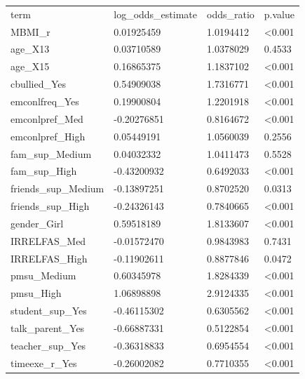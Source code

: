 \begin{table}
\centering
\begin{tabular}{llll}
term & log_odds_estimate & odds_ratio & p.value \\
MBMI_r & 0.01925459 & 1.0194412 & <0.001 \\
age_X13 & 0.03710589 & 1.0378029 & 0.4533 \\
age_X15 & 0.16865375 & 1.1837102 & <0.001 \\
cbullied_Yes & 0.54909038 & 1.7316771 & <0.001 \\
emconlfreq_Yes & 0.19900804 & 1.2201918 & <0.001 \\
emconlpref_Med & -0.20276851 & 0.8164672 & <0.001 \\
emconlpref_High & 0.05449191 & 1.0560039 & 0.2556 \\
fam_sup_Medium & 0.04032332 & 1.0411473 & 0.5528 \\
fam_sup_High & -0.43200932 & 0.6492033 & <0.001 \\
friends_sup_Medium & -0.13897251 & 0.8702520 & 0.0313 \\
friends_sup_High & -0.24326143 & 0.7840665 & <0.001 \\
gender_Girl & 0.59518189 & 1.8133607 & <0.001 \\
IRRELFAS_Med & -0.01572470 & 0.9843983 & 0.7431 \\
IRRELFAS_High & -0.11902611 & 0.8877846 & 0.0472 \\
pmsu_Medium & 0.60345978 & 1.8284339 & <0.001 \\
pmsu_High & 1.06898898 & 2.9124335 & <0.001 \\
student_sup_Yes & -0.46115302 & 0.6305562 & <0.001 \\
talk_parent_Yes & -0.66887331 & 0.5122854 & <0.001 \\
teacher_sup_Yes & -0.36318833 & 0.6954554 & <0.001 \\
timeexe_r_Yes & -0.26002082 & 0.7710355 & <0.001 \\
\end{tabular}
\end{table}
